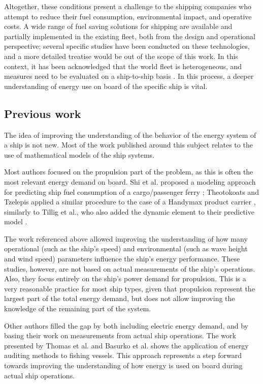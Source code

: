 \documentclass[preprint,12pt]{elsarticle}
\begin{document}
Altogether, these conditions present a challenge to the shipping companies who attempt to reduce their fuel consumption, environmental impact, and operative costs. A wide range of fuel saving solutions for shipping are available and partially implemented in the existing fleet, both from the design and operational perspective; several specific studies have been conducted on these technologies, and a more detailed treatise would be out of the scope of this work. In this context, it has been acknowledged that the world fleet is heterogeneous, and measures need to be evaluated on a ship-to-ship basis \cite{Bouman2017}. In this process, a deeper understanding of energy use on board of the specific ship is vital.

\subsection{Previous work}

The idea of improving the understanding of the behavior of the energy system of a ship is not new. Most of the work published around this subject relates to the use  of mathematical models of the ship systems. 

Most authors focused on the propulsion part of the problem, as this is often the most relevant energy demand on board. Shi et al. proposed a modeling approach for predicting ship fuel consumption of a cargo/passenger ferry \cite{Shi2009}; Theotokoats and Tzelepis applied a similar procedure to the case of a Handymax product carrier \cite{Theotokatos2015}, similarly to Tillig et al., who also added the dynamic element to their predictive model \cite{Tillig2016}. 

The work referenced above allowed improving the understanding of how many operational (such as the ship's speed) and environmental (such as wave height and wind speed) parameters influence the ship's energy performance. These studies, however, are not based on actual measurements of the ship's operations. Also, they focus entirely on the ship's power demand for propulsion. This is a very reasonable practice for most ship types, given that propulsion represent the largest part of the total energy demand, but does not allow improving the knowledge of the remaining part of the system.

Other authors filled the gap by both including electric energy demand, and by basing their work on measurements from actual ship operations. The work presented by Thomas et al. \cite{Thomas2010} and Basurko et al. \cite{Basurko2013} shows the application of energy auditing methods to fishing vessels. This approach represents a step forward towards improving the understanding of how energy is used on board during actual ship operations.  
\end{document}
